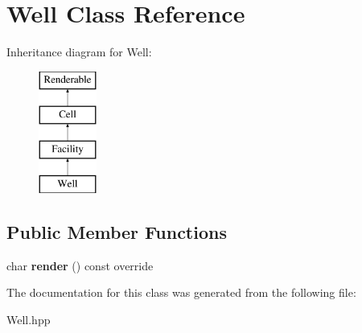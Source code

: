 \hypertarget{class_well}{}\section{Well Class Reference}
\label{class_well}
Inheritance diagram for Well\+:\begin{figure}[H]
\begin{center}
\leavevmode
\includegraphics[height=4.000000cm]{class_well}
\end{center}
\end{figure}
\subsection*{Public Member Functions}
\begin{DoxyCompactItemize}
\item 
\mbox{\label{class_well_a6a01858d1851a60b7ebac20b2c8a295f}} 
char {\bfseries render} () const override
\end{DoxyCompactItemize}


The documentation for this class was generated from the following file\+:\begin{DoxyCompactItemize}
\item 
Well.\+hpp\end{DoxyCompactItemize}
